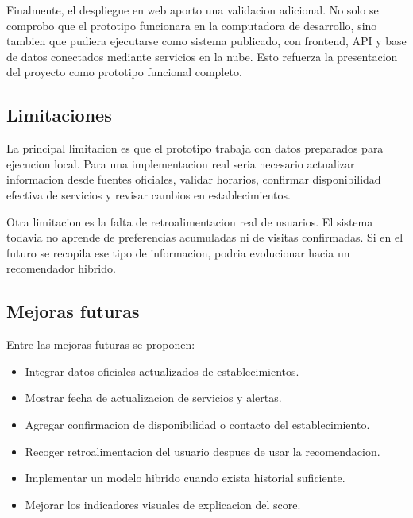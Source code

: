 \documentclass[12pt,a4paper]{article}
\begin{document}
Finalmente, el despliegue en web aporto una validacion adicional. No solo se comprobo que el prototipo funcionara en la computadora de desarrollo, sino tambien que pudiera ejecutarse como sistema publicado, con frontend, API y base de datos conectados mediante servicios en la nube. Esto refuerza la presentacion del proyecto como prototipo funcional completo.

\subsection{Limitaciones}
La principal limitacion es que el prototipo trabaja con datos preparados para ejecucion local. Para una implementacion real seria necesario actualizar informacion desde fuentes oficiales, validar horarios, confirmar disponibilidad efectiva de servicios y revisar cambios en establecimientos.

Otra limitacion es la falta de retroalimentacion real de usuarios. El sistema todavia no aprende de preferencias acumuladas ni de visitas confirmadas. Si en el futuro se recopila ese tipo de informacion, podria evolucionar hacia un recomendador hibrido.

\subsection{Mejoras futuras}
Entre las mejoras futuras se proponen:

\begin{itemize}[leftmargin=*]
  \item Integrar datos oficiales actualizados de establecimientos.
  \item Mostrar fecha de actualizacion de servicios y alertas.
  \item Agregar confirmacion de disponibilidad o contacto del establecimiento.
  \item Recoger retroalimentacion del usuario despues de usar la recomendacion.
  \item Implementar un modelo hibrido cuando exista historial suficiente.
  \item Mejorar los indicadores visuales de explicacion del score.
\end{itemize}
\end{document}
